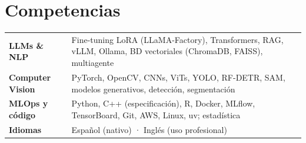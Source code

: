 \documentclass[a4paper,11pt]{article}
\begin{document}
\section{Competencias}
\small
\begin{tabularx}{\textwidth}{@{}p{1.21in}>{\raggedright\arraybackslash}X@{}}
  \textbf{LLMs \& NLP} & Fine-tuning LoRA (LLaMA-Factory), Transformers, RAG, vLLM, Ollama, BD vectoriales (ChromaDB, FAISS), multiagente \\
  \textbf{Computer Vision} & PyTorch, OpenCV, CNNs, ViTs, YOLO, RF-DETR, SAM, modelos generativos, detección, segmentación \\
  \textbf{MLOps y código} & Python, C++ (especificación), R, Docker, MLflow, TensorBoard, Git, AWS, Linux, uv; estadística \\
  \textbf{Idiomas} & Español (nativo) · Inglés (uso profesional) \\
\end{tabularx}
\end{document}
